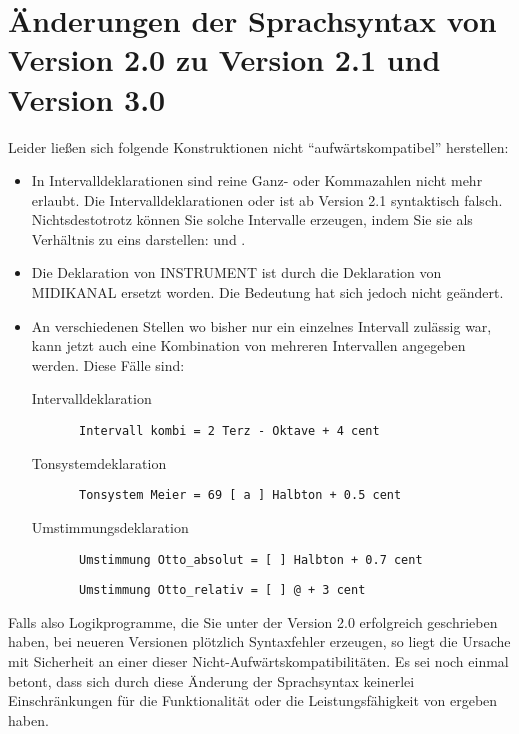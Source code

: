 \chapter[Änderungen der Sprachsyntax (2.0 $\rightarrow$ 2.1/3.0)]
{Änderungen der Sprachsyntax von Version 2.0 zu Version 2.1 und Version 3.0}\label{cha:ander-der-sprachsynt}

Leider ließen sich folgende Konstruktionen nicht "`aufwärtskompatibel"' 
herstellen:
\begin{itemize} 
\item In Intervalldeklarationen sind reine Ganz- oder Kommazahlen
  nicht mehr erlaubt.  Die Intervalldeklarationen  oder  ist ab Version 2.1
  syntaktisch falsch.  Nichtsdestotrotz können Sie solche Intervalle
  erzeugen, indem Sie sie als Verhältnis zu eins darstellen:  und .
\item Die Deklaration von INSTRUMENT ist durch die Deklaration von
  MIDIKANAL ersetzt worden. Die Bedeutung hat sich jedoch nicht
  geändert.
\item An verschiedenen Stellen wo bisher nur ein einzelnes Intervall
  zulässig war, kann jetzt auch eine Kombination von mehreren
  Intervallen angegeben werden.  Diese Fälle sind:
  \begin{description}
  \item[Intervalldeklaration]
\begin{verbatim} 
 Intervall kombi = 2 Terz - Oktave + 4 cent
\end{verbatim}
  \item[Tonsystemdeklaration]
\begin{verbatim}
 Tonsystem Meier = 69 [ a ] Halbton + 0.5 cent
\end{verbatim}
  \item[Umstimmungsdeklaration]
\begin{verbatim}
 Umstimmung Otto_absolut = [ ] Halbton + 0.7 cent
\end{verbatim}
\begin{verbatim}
 Umstimmung Otto_relativ = [ ] @ + 3 cent
\end{verbatim}
  \end{description}
\end{itemize}

Falls also Logikprogramme, die Sie unter der Version 2.0 erfolgreich 
geschrieben haben, bei neueren Versionen plötzlich Syntaxfehler 
erzeugen, so liegt die Ursache mit Sicherheit an einer dieser 
Nicht-Aufwärtskompatibilitäten. Es sei noch einmal betont, dass sich durch 
diese Änderung der Sprachsyntax keinerlei Einschränkungen für die 
Funktionalität oder die Leistungsfähigkeit von \mutabor{} ergeben haben.

